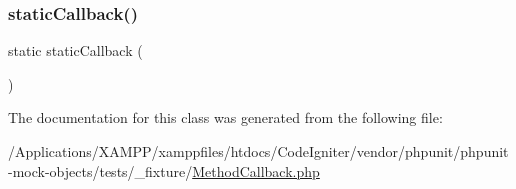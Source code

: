 \subsubsection{\texorpdfstring{static\+Callback()}{staticCallback()}}
{\footnotesize\ttfamily static static\+Callback (\begin{DoxyParamCaption}{ }\end{DoxyParamCaption})\hspace{0.3cm}{\ttfamily [static]}}



The documentation for this class was generated from the following file\+:\begin{DoxyCompactItemize}
\item 
/\+Applications/\+X\+A\+M\+P\+P/xamppfiles/htdocs/\+Code\+Igniter/vendor/phpunit/phpunit-\/mock-\/objects/tests/\+\_\+fixture/\mbox{\hyperlink{_method_callback_8php}{Method\+Callback.\+php}}\end{DoxyCompactItemize}
